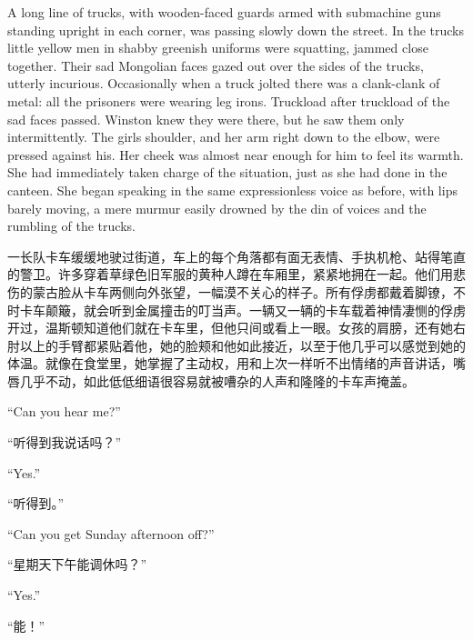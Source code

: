 \begin{paracol}{2}
A long line of trucks, with wooden-faced guards armed with submachine
guns standing upright in each corner, was passing slowly down the
street. In the trucks little yellow men in shabby greenish uniforms were
squatting, jammed close together. Their sad Mongolian faces gazed out
over the sides of the trucks, utterly incurious. Occasionally when a
truck jolted there was a clank-clank of metal: all the prisoners were
wearing leg irons. Truckload after truckload of the sad faces passed.
Winston knew they were there, but he saw them only intermittently. The
girl\textquotesingle s shoulder, and her arm right down to the elbow,
were pressed against his. Her cheek was almost near enough for him to
feel its warmth. She had immediately taken charge of the situation, just
as she had done in the canteen. She began speaking in the same
expressionless voice as before, with lips barely moving, a mere murmur
easily drowned by the din of voices and the rumbling of the trucks.

\switchcolumn

一长队卡车缓缓地驶过街道，车上的每个角落都有面无表情、手执机枪、站得笔直的警卫。许多穿着草绿色旧军服的黄种人蹲在车厢里，紧紧地拥在一起。他们用悲伤的蒙古脸从卡车两侧向外张望，一幅漠不关心的样子。所有俘虏都戴着脚镣，不时卡车颠簸，就会听到金属撞击的叮当声。一辆又一辆的卡车载着神情凄恻的俘虏开过，温斯顿知道他们就在卡车里，但他只间或看上一眼。女孩的肩膀，还有她右肘以上的手臂都紧贴着他，她的脸颊和他如此接近，以至于他几乎可以感觉到她的体温。就像在食堂里，她掌握了主动权，用和上次一样听不出情绪的声音讲话，嘴唇几乎不动，如此低低细语很容易就被嘈杂的人声和隆隆的卡车声掩盖。

\switchcolumn*

``Can you hear me?''

\switchcolumn

``听得到我说话吗？''

\switchcolumn*

``Yes.''

\switchcolumn

``听得到。''

\switchcolumn*

``Can you get Sunday afternoon off?''

\switchcolumn

``星期天下午能调休吗？''

\switchcolumn*

``Yes.''

\switchcolumn

``能！''

\switchcolumn*


\end{paracol}
